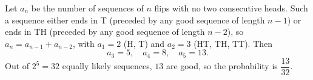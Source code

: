 Let $a_n$ be the number of sequences of $n$ flips with no two consecutive heads. Such a sequence either ends in T (preceded by any good sequence of length $n-1$) or ends in TH (preceded by any good sequence of length $n-2$), so $a_n=a_{n-1}+a_{n-2}$, with $a_1=2$ (H, T) and $a_2=3$ (HT, TH, TT). Then
\[
a_3=5,\quad a_4=8,\quad a_5=13 .
\]
Out of $2^5=32$ equally likely sequences, $13$ are good, so the probability is $\boxed{\dfrac{13}{32}}$.
